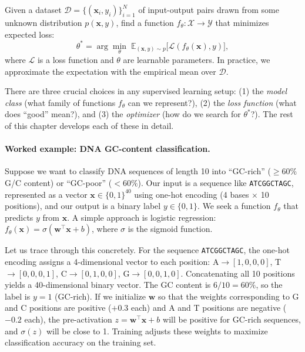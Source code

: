 \begin{dogmadef}
Given a dataset $\mathcal{D} = \{(\mathbf{x}_i, y_i)\}_{i=1}^N$ of input-output pairs drawn from some unknown distribution $p(\mathbf{x}, y)$, find a function $f_\theta : \mathcal{X} \to \mathcal{Y}$ that minimizes expected loss:
\begin{equation}
\theta^* = \arg\min_\theta \; \mathbb{E}_{(\mathbf{x}, y) \sim p} \bigl[ \mathcal{L}(f_\theta(\mathbf{x}), y) \bigr],
\label{eq:erm}
\end{equation}
where $\mathcal{L}$ is a loss function and $\theta$ are learnable parameters. In practice, we approximate the expectation with the empirical mean over $\mathcal{D}$.
\end{dogmadef}

There are three crucial choices in any supervised learning setup: (1) the \emph{model class} (what family of functions $f_\theta$ can we represent?), (2) the \emph{loss function} (what does ``good'' mean?), and (3) the \emph{optimizer} (how do we search for $\theta^*$?). The rest of this chapter develops each of these in detail.

\paragraph{Worked example: DNA GC-content classification.} Suppose we want to classify DNA sequences of length 10 into ``GC-rich'' ($\geq 60\%$ G/C content) or ``GC-poor'' ($< 60\%$). Our input is a sequence like \texttt{ATCGGCTAGC}, represented as a vector $\mathbf{x} \in \{0,1\}^{40}$ using one-hot encoding (4 bases $\times$ 10 positions), and our output is a binary label $y \in \{0, 1\}$. We seek a function $f_\theta$ that predicts $y$ from $\mathbf{x}$. A simple approach is logistic regression: $f_\theta(\mathbf{x}) = \sigma(\mathbf{w}^\top \mathbf{x} + b)$, where $\sigma$ is the sigmoid function.

Let us trace through this concretely. For the sequence \texttt{ATCGGCTAGC}, the one-hot encoding assigns a 4-dimensional vector to each position: A$\to[1,0,0,0]$, T$\to[0,0,0,1]$, C$\to[0,1,0,0]$, G$\to[0,0,1,0]$. Concatenating all 10 positions yields a 40-dimensional binary vector. The GC content is $6/10 = 60\%$, so the label is $y = 1$ (GC-rich). If we initialize $\mathbf{w}$ so that the weights corresponding to G and C positions are positive ($+0.3$ each) and A and T positions are negative ($-0.2$ each), the pre-activation $z = \mathbf{w}^\top \mathbf{x} + b$ will be positive for GC-rich sequences, and $\sigma(z)$ will be close to 1. Training adjusts these weights to maximize classification accuracy on the training set.

